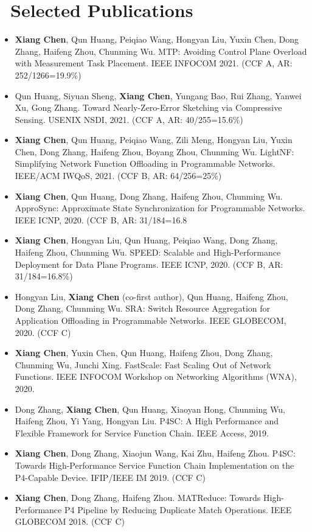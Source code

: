 \documentclass{resume}
\begin{document}
\section{\faBook\ Selected Publications}
\begin{itemize}[parsep=0.5ex]
  \item \textbf{Xiang Chen}, Qun Huang, Peiqiao Wang, Hongyan Liu, Yuxin Chen, Dong Zhang, Haifeng Zhou, Chunming Wu. MTP: Avoiding Control Plane Overload with Measurement Task Placement. IEEE INFOCOM 2021. (CCF A, AR: 252/1266=19.9\%)
  \item Qun Huang, Siyuan Sheng, \textbf{Xiang Chen}, Yungang Bao, Rui Zhang, Yanwei Xu, Gong Zhang. Toward Nearly-Zero-Error Sketching via Compressive Sensing. USENIX NSDI, 2021. (CCF A, AR: 40/255=15.6\%)
  \item \textbf{Xiang Chen}, Qun Huang, Peiqiao Wang, Zili Meng, Hongyan Liu, Yuxin Chen, Dong Zhang, Haifeng Zhou, Boyang Zhou, Chunming Wu. LightNF: Simplifying Network Function Offloading in Programmable Networks. IEEE/ACM IWQoS, 2021. (CCF B, AR: 64/256=25\%)
  \item \textbf{Xiang Chen}, Qun Huang, Dong Zhang, Haifeng Zhou, Chunming Wu. ApproSync: Approximate State Synchronization for Programmable Networks. IEEE ICNP, 2020. (CCF B, AR: 31/184=16.8%
  \item \textbf{Xiang Chen}, Hongyan Liu, Qun Huang, Peiqiao Wang, Dong Zhang, Haifeng Zhou, Chunming Wu. SPEED: Scalable and High-Performance Deployment for Data Plane Programs. IEEE ICNP, 2020. (CCF B, AR: 31/184=16.8\%)
  \item Hongyan Liu, \textbf{Xiang Chen} (co-first author), Qun Huang, Haifeng Zhou, Dong Zhang, Chunming Wu. SRA: Switch Resource Aggregation for Application Offloading in Programmable Networks. IEEE GLOBECOM, 2020. (CCF C)
  \item \textbf{Xiang Chen}, Yuxin Chen, Qun Huang, Haifeng Zhou, Dong Zhang, Chunming Wu, Junchi Xing. FastScale: Fast Scaling Out of Network Functions. IEEE INFOCOM Workshop on Networking Algorithms (WNA), 2020.
  \item Dong Zhang, \textbf{Xiang Chen}, Qun Huang, Xiaoyan Hong, Chunming Wu, Haifeng Zhou, Yi Yang, Hongyan Liu. P4SC: A High Performance and Flexible Framework for Service Function Chain. IEEE Access, 2019.
  \item \textbf{Xiang Chen}, Dong Zhang, Xiaojun Wang, Kai Zhu, Haifeng Zhou. P4SC: Towards High-Performance Service Function Chain Implementation on the P4-Capable Device. IFIP/IEEE IM 2019. (CCF C)
  \item \textbf{Xiang Chen}, Dong Zhang, Haifeng Zhou. MATReduce: Towards High-Performance P4 Pipeline by Reducing Duplicate Match Operations. IEEE GLOBECOM 2018. (CCF C)
\end{itemize}

%
%
\end{document}
